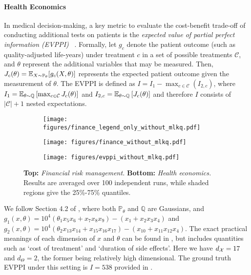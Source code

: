 \paragraph{Health Economics}
In medical decision-making, a key metric to evaluate the cost-benefit trade-off of conducting additional tests on patients is the \textit{expected value of partial perfect information (EVPPI)}
~\citep{brennan2007calculating,Heath2017}. 
Formally, let $g_c$ denote the patient outcome (such as quality-adjusted life-years) under treatment $c$ in a set of possible treatments $\mathcal{C}$, and $\theta$ represent the additional variables that may be measured. Then,  
$J_c(\theta) = \operatorname{\mathbb{E}}_{X \sim \mathbb{P}_\theta} [g_c(X, \theta)]$ represents the expected patient outcome given the measurement of $\theta$. 
The EVPPI is defined as $I = I_1 - \max_{c \in \mathcal{C}}(I_{2,c})$, where $I_1 = \operatorname{\mathbb{E}}_{\theta \sim \mathbb{Q}} \left[\max_{c \in \mathcal{C}} J_c(\theta)\right]$ and $I_{2,c} = \operatorname{\mathbb{E}}_{\theta \sim \mathbb{Q}}\left[J_c(\theta)\right]$
and therefore $I$ consists of $|\mathcal{C}| + 1$ nested expectations.


\begin{figure}[t]
\vspace{-5pt}
\centering
\begin{subfigure}{\linewidth}
    \centering
    \texttt{[image: figures/finance\_legend\_only\_without\_mlkq.pdf]}
\end{subfigure}
\vspace{-5pt}
\begin{subfigure}{0.45\linewidth}
    \centering
    \texttt{[image: figures/finance\_without\_mlkq.pdf]}
\end{subfigure}
\vspace{-5pt}
\begin{subfigure}{0.45\linewidth}
    \centering
    \texttt{[image: figures/evppi\_without\_mlkq.pdf]}
\end{subfigure}
\caption{
\textbf{Top:} \emph{Financial risk management.}
\textbf{Bottom:} \emph{Health economics.}
Results are averaged over 100 independent runs, while shaded 
regions give the 25\%-75\% quantiles.
}
\label{fig:finance_health}
\end{figure}

We follow Section 4.2 of \citet{giles2019decision}, where both $\mathbb{P}_{\theta}$ and $\mathbb{Q}$ are Gaussians, and $g_1(x, \theta)=10^4 (\theta_1 x_5 x_6 + x_7 x_8 x_{9})-(x_1 + x_2 x_3 x_4)$ and $g_2(x, \theta) = 10^4 (\theta_2 x_{13} x_{14} + x_{15} x_{16} x_{17})-(x_{10} + x_{11} x_{12} x_4)$. 
The exact practical meanings of each dimension of $x$ and $\theta$ can be found in , but includes quantities such as `cost of treatment' and `duration of side effects'.
Here we have $d_{\mathcal{X}} = 17$ and $d_\Theta = 2$, the former being relatively high dimensional.
The ground truth EVPPI under this setting is $I=538$ provided in \citet{giles2019decision}.

